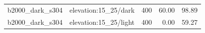 \begin{longtable}{l>{\raggedright\arraybackslash}p{.42\linewidth}rrr}
b2000\_\allowbreak{}dark\_\allowbreak{}s304 & %
elevation:15\_\allowbreak{}25/dark & %
400 & %
60.00 & %
98.89 \\ %

b2000\_\allowbreak{}dark\_\allowbreak{}s304 & %
elevation:15\_\allowbreak{}25/light & %
400 & %
0.00 & %
59.27 \\ %


\end{longtable}

